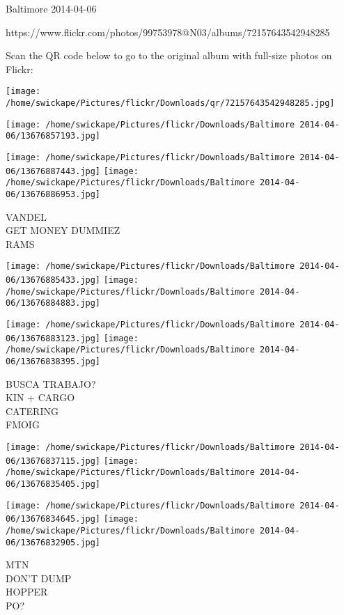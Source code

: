 \documentclass[10pt,letterpaper]{article}
\begin{document}
Baltimore 2014-04-06

https://www.flickr.com/photos/99753978@N03/albums/72157643542948285

Scan the QR code below to go to the original album with full-size photos on Flickr:

\texttt{[image: /home/swickape/Pictures/flickr/Downloads/qr/72157643542948285.jpg]}
\pagebreak

\texttt{[image: /home/swickape/Pictures/flickr/Downloads/Baltimore 2014-04-06/13676857193.jpg]}

\vspace{0.25in}
\texttt{[image: /home/swickape/Pictures/flickr/Downloads/Baltimore 2014-04-06/13676887443.jpg]}
\texttt{[image: /home/swickape/Pictures/flickr/Downloads/Baltimore 2014-04-06/13676886953.jpg]}

VANDEL\\
GET MONEY DUMMIEZ\\
RAMS\\
\pagebreak

\texttt{[image: /home/swickape/Pictures/flickr/Downloads/Baltimore 2014-04-06/13676885433.jpg]}
\texttt{[image: /home/swickape/Pictures/flickr/Downloads/Baltimore 2014-04-06/13676884883.jpg]}

\texttt{[image: /home/swickape/Pictures/flickr/Downloads/Baltimore 2014-04-06/13676883123.jpg]}
\texttt{[image: /home/swickape/Pictures/flickr/Downloads/Baltimore 2014-04-06/13676838395.jpg]}

BUSCA TRABAJO?\\
KIN + CARGO\\
CATERING\\
FMOIG\\
\pagebreak

\texttt{[image: /home/swickape/Pictures/flickr/Downloads/Baltimore 2014-04-06/13676837115.jpg]}
\texttt{[image: /home/swickape/Pictures/flickr/Downloads/Baltimore 2014-04-06/13676835405.jpg]}

\texttt{[image: /home/swickape/Pictures/flickr/Downloads/Baltimore 2014-04-06/13676834645.jpg]}
\texttt{[image: /home/swickape/Pictures/flickr/Downloads/Baltimore 2014-04-06/13676832905.jpg]}

MTN\\
DON'T DUMP\\
HOPPER\\
PO?\\
\pagebreak
\end{document}
